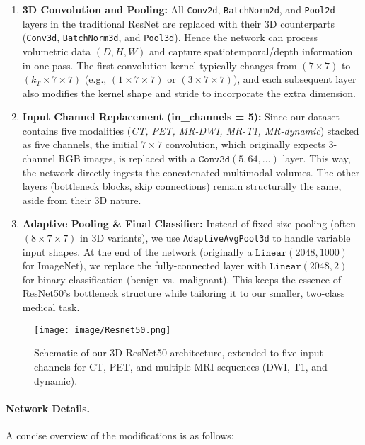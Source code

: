 \documentclass{article}
\begin{document}
\begin{enumerate}
    \item \textbf{3D Convolution and Pooling:} 
    All \texttt{Conv2d}, \texttt{BatchNorm2d}, and \texttt{Pool2d} layers in the traditional ResNet are replaced with their 3D counterparts (\texttt{Conv3d}, \texttt{BatchNorm3d}, and \texttt{Pool3d}). Hence the network can process volumetric data $(D, H, W)$ and capture spatiotemporal/depth information in one pass. The first convolution kernel typically changes from $(7\times7)$ to $(k_T\times7\times7)$ (e.g., $(1\times7\times7)$ or $(3\times7\times7)$), and each subsequent layer also modifies the kernel shape and stride to incorporate the extra dimension.

    \item \textbf{Input Channel Replacement (in\_channels = 5):}
    Since our dataset contains five modalities (\textit{CT, PET, MR-DWI, MR-T1, MR-dynamic}) stacked as five channels, the initial $7\times7$ convolution, which originally expects 3-channel RGB images, is replaced with a $\texttt{Conv3d}(5, 64, \dots)$ layer. This way, the network directly ingests the concatenated multimodal volumes. The other layers (bottleneck blocks, skip connections) remain structurally the same, aside from their 3D nature.

    \item \textbf{Adaptive Pooling \& Final Classifier:}
    Instead of fixed-size pooling (often $(8\times7\times7)$ in 3D variants), we use \texttt{AdaptiveAvgPool3d} to handle variable input shapes. At the end of the network (originally a $\texttt{Linear}(2048, 1000)$ for ImageNet), we replace the fully-connected layer with $\texttt{Linear}(2048, 2)$ for binary classification (benign vs.\ malignant). This keeps the essence of ResNet50's bottleneck structure while tailoring it to our smaller, two-class medical task.
\end{enumerate}

\begin{figure}[H]
\centering
\texttt{[image: image/Resnet50.png]}
\caption{Schematic of our 3D ResNet50 architecture, extended to five input channels for CT, PET, and multiple MRI sequences (DWI, T1, and dynamic).}
\label{fig:3dresnet50}
\end{figure}

\paragraph{Network Details.}
A concise overview of the modifications is as follows:
\end{document}
